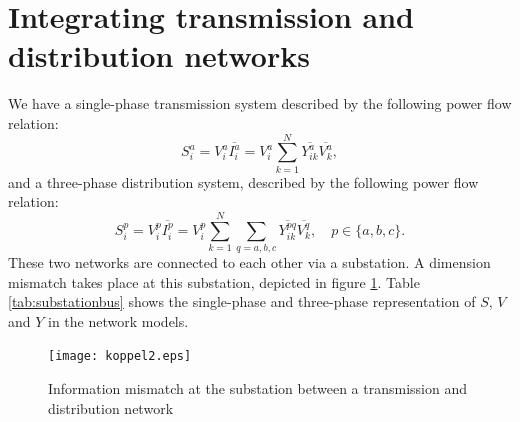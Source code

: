 \documentclass[10pt,journal]{article}
\begin{document}
\begin{table}[h]
\begin{adjustbox}{width=1\textwidth}
\begin{tabular}{ccccc}
\bottomrule
\end{tabular}
\end{adjustbox}
\end{table}

\section{Integrating transmission and distribution networks}
We have a single-phase transmission system described by the following power flow relation: 
 \begin{equation}\label{eq:SVIa}
   S_i^a=V_i^a\overline{I^a_i}=V_i^a\sum_{k=1}^N\overline{Y^a_{ik}}\overline{V^a_k}     ,
\end{equation}
and a three-phase distribution system, described by the following power flow relation:
\begin{equation}\label{eq:SVIp}
    S_i^p=V_i^p\overline{I^p_i}=V_i^p\sum_{k=1}^N\sum_{q=a,b,c}\overline{Y^{pq}_{ik}}\overline{V^q_k},\quad p\in\{a,b,c\}.
\end{equation}
These two networks are connected to each other via a substation. A dimension mismatch takes place at this substation, depicted in figure \ref{fig:boundary}. Table \ref{tab:substationbus} shows the single-phase and three-phase representation of $S$, $V$ and $Y$ in the network models. 
\begin{figure}[b]
    \centering
    \texttt{[image: koppel2.eps]}
    \caption{Information mismatch at the substation between a transmission and distribution network}
    \label{fig:boundary}
\end{figure}
\end{document}
